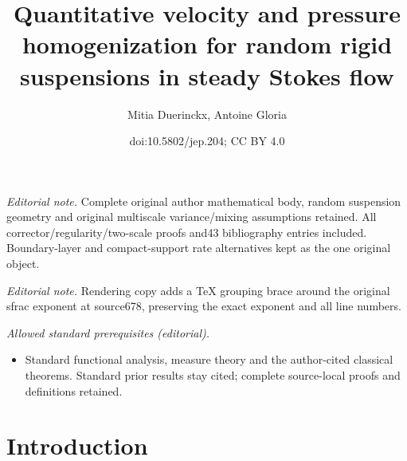 \documentclass[10pt]{amsart}
\title{Quantitative velocity and pressure homogenization for random rigid suspensions in steady Stokes flow}
\author{Mitia Duerinckx, Antoine Gloria}
\date{doi:10.5802/jep.204; CC BY 4.0}
\newcounter{assumption}
\theoremstyle{plain}
\theoremstyle{definition}
\begin{document}
\maketitle
\noindent\textit{Editorial note.} Complete original author mathematical body, random suspension geometry and original multiscale variance/mixing assumptions retained. All corrector/regularity/two-scale proofs and43 bibliography entries included. Boundary-layer and compact-support rate alternatives kept as the one original object.\par\medskip
\noindent\textit{Editorial note.} Rendering copy adds a TeX grouping brace around the original sfrac exponent at source678, preserving the exact exponent and all line numbers.\par\medskip
\noindent\textit{Allowed standard prerequisites (editorial).}\begin{itemize}
\item Standard functional analysis, measure theory and the author-cited classical theorems. Standard prior results stay cited; complete source-local proofs and definitions retained.
\end{itemize}\medskip
\vspace*{-\baselineskip}
\tableofcontents


\section{Introduction}
\end{document}
